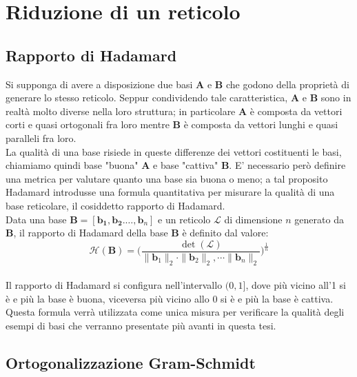 \section{Riduzione di un reticolo}
\subsection{Rapporto di Hadamard}
\label{sec:hadamard}
Si supponga di avere a disposizione due basi $\mathbf{A}$ e $\mathbf{B}$ che godono della
proprietà di generare lo stesso reticolo. Seppur condividendo tale caratteristica, 
$\mathbf{A}$ e $\mathbf{B}$ sono in realtà molto diverse nella loro struttura; in particolare
$\mathbf{A}$ è composta da vettori corti e quasi ortogonali fra loro mentre $\mathbf{B}$ è
composta da vettori lunghi e quasi paralleli fra loro.\\
La qualità di una base risiede in queste differenze dei vettori costituenti le basi, chiamiamo
quindi base "buona" $\mathbf{A}$ e base "cattiva" $\mathbf{B}$.
E' necessario però definire una metrica per valutare quanto una base sia buona o meno; a tal
proposito Hadamard\cite{HDMRD08} introdusse una formula quantitativa per misurare la qualità
di una base reticolare, il cosiddetto rapporto di Hadamard. \\

Data una base $\mathbf{B} = [\mathbf{b_1}, \mathbf{b_2}. \dots, \mathbf{b}_n]$ e un reticolo
$\mathcal{L}$ di dimensione $n$ generato da $\mathbf{B}$, il rapporto di Hadamard della base
$\mathbf{B}$ è definito dal valore:
\[
\mathcal{H}(\mathbf{B}) = 
    \Biggl( 
        \frac{\det(\mathcal{L})}
        {\|\mathbf{b}_1\|_2 \cdot \|\mathbf{b}_2\|_2, \cdots \|\mathbf{b}_n\|_2} 
    \Biggr)^{\frac{1}{n}}
\]
\\
Il rapporto di Hadamard si configura nell'intervallo $(0, 1]$, dove più vicino all'1 si è 
e più la base è buona, viceversa più vicino allo 0 si è e più la base è cattiva. Questa formula
verrà utilizzata come unica misura per verificare la qualità degli esempi di basi che verranno
presentate più avanti in questa tesi.

\subsection{Ortogonalizzazione Gram-Schmidt}
 
